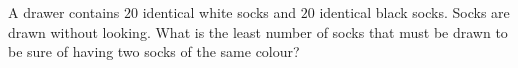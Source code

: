 A drawer contains $20$ identical white socks and $20$ identical black socks. Socks are drawn without looking. What is the least number of socks that must be drawn to be sure of having two socks of the same colour?
